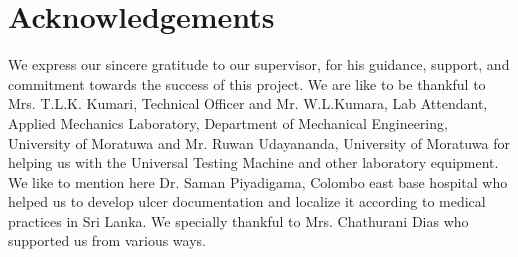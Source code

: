 \chapter*{Acknowledgements}

\vspace{10mm}
We express our sincere gratitude to our supervisor, \supervisorA \space for his guidance, support, and commitment towards the success of this project. We are like to be thankful to Mrs. T.L.K. Kumari, Technical Officer and Mr. W.L.Kumara, Lab Attendant, Applied Mechanics Laboratory, Department of Mechanical Engineering, University of Moratuwa and Mr. Ruwan Udayananda, University of Moratuwa for helping us with the Universal Testing Machine and other laboratory equipment. We like to mention here Dr. Saman Piyadigama, Colombo east base hospital who helped us to develop ulcer documentation and localize it according to medical practices in Sri Lanka. We specially thankful to Mrs. Chathurani Dias who supported us from various ways. 
